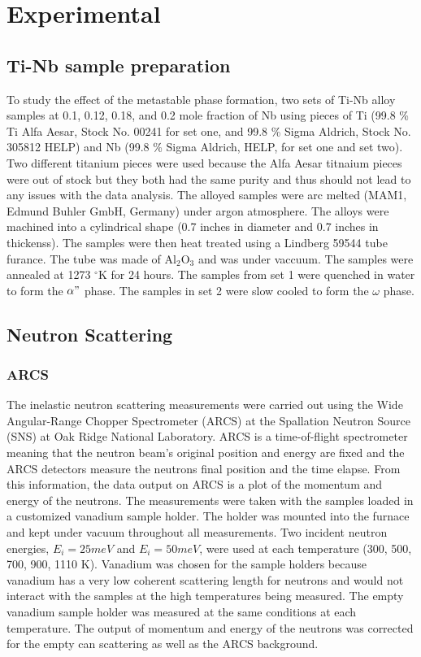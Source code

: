 \section{Experimental}

\subsection{Ti-Nb sample preparation}

To study the effect of the metastable phase formation, two sets of Ti-Nb alloy samples at 0.1, 0.12, 0.18, and 0.2 mole fraction of Nb using pieces of Ti (99.8 \% Ti Alfa Aesar, Stock No. 00241 for set one, and 99.8 \% Sigma Aldrich, Stock No. 305812 HELP) and Nb (99.8 \% Sigma Aldrich, HELP, for set one and set two). Two different titanium pieces were used because the Alfa Aesar titnaium pieces were out of stock but they both had the same purity and thus should not lead to any issues with the data analysis. The alloyed samples were arc melted (MAM1, Edmund Buhler GmbH, Germany) under argon atmosphere. The alloys were machined into a cylindrical shape (0.7 inches in diameter and 0.7 inches in thickenss). The samples were then heat treated using a Lindberg 59544 tube furance. The tube was made of Al$_{2}$O$_{3}$ and was under vaccuum. The samples were annealed at 1273 $^\circ$K for 24 hours. The samples from set 1 were quenched in water to form the $\alpha"$ phase. The samples in set 2 were slow cooled to form the $\omega$ phase. 

\subsection{Neutron Scattering}

\subsubsection{ARCS}

The inelastic neutron scattering measurements were carried out using the Wide Angular-Range Chopper Spectrometer (ARCS) at the Spallation Neutron Source (SNS) at Oak Ridge National Laboratory. ARCS is a time-of-flight spectrometer meaning that the neutron beam's original position and energy are fixed and the ARCS detectors measure the neutrons final position and the time elapse. From this information, the data output on ARCS is a plot of the momentum and energy of the neutrons. The measurements were taken with the samples loaded in a customized vanadium sample holder. The holder was mounted into the furnace and kept under vacuum throughout all measurements. Two incident neutron energies, $E_{i} = 25 meV$ and $E_{i} = 50 meV$, were used at each temperature (300, 500, 700, 900, 1110 K). Vanadium was chosen for the sample holders because vanadium has a very low coherent scattering length for neutrons and would not interact with the samples at the high temperatures being measured. The empty vanadium sample holder was measured at the same conditions at each temperature. The output of momentum and energy of the neutrons was corrected for the empty can scattering as well as the ARCS background. 

